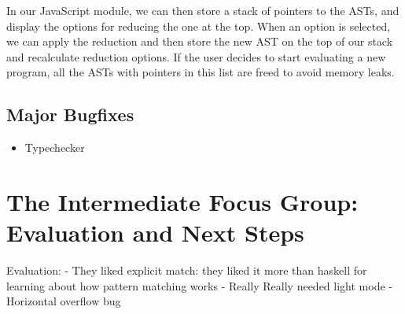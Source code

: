 In our JavaScript module, we can then store a stack of pointers to the \ac{AST}s, and display the options for reducing the one at the top. When an option is selected, we can apply the reduction and then store the new \ac{AST} on the top of our stack and recalculate reduction options. If the user decides to start evaluating a new program, all the \ac{AST}s with pointers in this list are freed to avoid memory leaks.
\subsection{Major Bugfixes}
\begin{itemize}
    \item Typechecker
\end{itemize}

\section{The Intermediate Focus Group: Evaluation and Next Steps}
\label{eval:IFG}
Evaluation:
- They liked explicit match: they liked it more than haskell for learning about how pattern matching works
- Really Really needed light mode
- Horizontal overflow bug